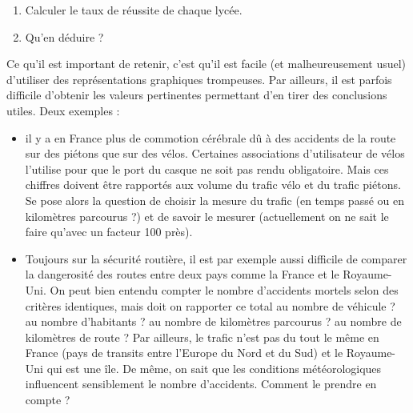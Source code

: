 \documentclass[10pt, a4paper]{article}
\begin{document}
\begin{tcolorbox}[lefttitle=2cm, colframe=gray!75!black, colback=white, title=\textbf{EXERCICE 4 : Paradoxe de Simpson}]
\begin{tcolorbox}[lefttitle=1cm, colframe=gray!75!black, colback=white, title=\textbf{EXERCICE 4.2 : représentation 2}]
\begin{minipage}{0.4\textwidth}
\end{minipage} \hfill
\begin{minipage}{0.6\textwidth}


\begin{enumerate}
    \item Calculer le taux de réussite de chaque lycée. 
    \item Qu’en déduire ?
\end{enumerate}
\end{minipage}


\vspace{3cm}

\end{tcolorbox}

\end{tcolorbox}







Ce qu’il est important de retenir, c’est qu’il est facile (et malheureusement usuel) d’utiliser des représentations
graphiques trompeuses. Par ailleurs, il est parfois difficile d’obtenir les valeurs pertinentes permettant d’en tirer des
conclusions utiles. Deux exemples : 
\begin{itemize}
    \item il y a en France plus de commotion cérébrale dû à des accidents de la route sur
des piétons que sur des vélos. Certaines associations d’utilisateur de vélos l’utilise pour que le port du casque ne soit
pas rendu obligatoire. Mais ces chiffres doivent être rapportés aux volume du trafic vélo et du trafic piétons. Se pose
alors la question de choisir la mesure du trafic (en temps passé ou en kilomètres parcourus ?) et de savoir le mesurer
(actuellement on ne sait le faire qu’avec un facteur 100 près).
\item  Toujours sur la sécurité routière, il est par exemple
aussi difficile de comparer la dangerosité des routes entre deux pays comme la France et le Royaume-Uni. On peut
bien entendu compter le nombre d’accidents mortels selon des critères identiques, mais doit on rapporter ce total
au nombre de véhicule ? au nombre d’habitants ? au nombre de kilomètres parcourus ? au nombre de kilomètres de
route ? Par ailleurs, le trafic n’est pas du tout le même en France (pays de transits entre l’Europe du Nord et du Sud)
et le Royaume-Uni qui est une île. De même, on sait que les conditions météorologiques influencent sensiblement le
nombre d’accidents. Comment le prendre en compte ? 
\end{itemize}
\end{document}
